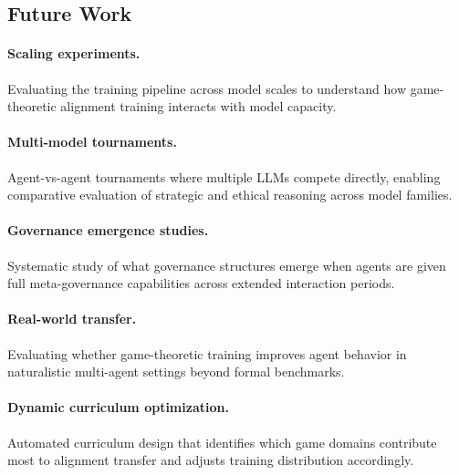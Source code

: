 \subsection{Future Work}

\paragraph{Scaling experiments.}
Evaluating the training pipeline across model scales to understand how
game-theoretic alignment training interacts with model capacity.

\paragraph{Multi-model tournaments.}
Agent-vs-agent tournaments where multiple LLMs compete directly,
enabling comparative evaluation of strategic and ethical reasoning
across model families.

\paragraph{Governance emergence studies.}
Systematic study of what governance structures emerge when agents are
given full meta-governance capabilities across extended interaction
periods.

\paragraph{Real-world transfer.}
Evaluating whether game-theoretic training improves agent behavior in
naturalistic multi-agent settings beyond formal benchmarks.

\paragraph{Dynamic curriculum optimization.}
Automated curriculum design that identifies which game domains
contribute most to alignment transfer and adjusts training distribution
accordingly.
